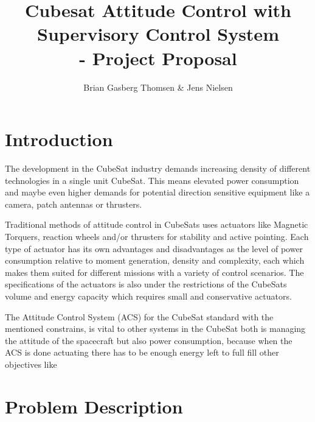 \documentclass[10pt,a4paper,oneside,openany,article]{memoir}
\title{\vspace{-2cm} Cubesat Attitude Control with Supervisory Control System \\ \Large - Project Proposal}
\author{Brian Gasberg Thomsen \& Jens Nielsen}
\begin{document}
\maketitle

\chapter{Introduction}
The development in the CubeSat industry demands increasing density of different technologies in a single unit CubeSat. This means elevated power consumption and maybe even higher demands for potential direction sensitive equipment like a camera, patch antennas or thrusters. 

Traditional methods of attitude control in CubeSats uses actuators like Magnetic Torquers, reaction wheels and/or thrusters for stability and active pointing. Each type of actuator has its own advantages and disadvantages as the level of power consumption relative to moment generation, density and complexity, each which makes them suited for different missions with a variety of control scenarios. The specifications of the actuators is also under the restrictions of the CubeSats volume and energy capacity which requires small and conservative actuators.

The Attitude Control System (ACS) for the CubeSat standard with the mentioned constrains, is vital to other systems in the CubeSat both is managing the attitude of the spacecraft but also power consumption, because when the ACS is done actuating there has to be enough energy left to full fill other objectives like 


\chapter{Problem Description}

\end{document}
